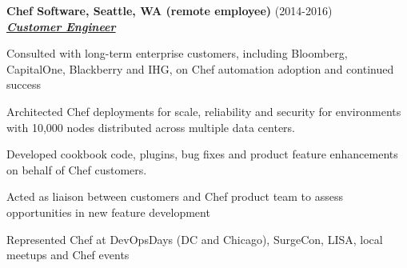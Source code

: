 \documentclass{article}
\newcommand{\employer}[3]{{ \textbf{#1} (#2)\\ \underline{\textbf{\emph{#3}}}\\ \nopagebreak }}
\newenvironment{achievements}{\begin{list}{\topsep 0pt \itemsep -2pt}} {\vspace*{4pt}\end{list}}
\begin{document}
\employer{Chef Software, Seattle, WA (remote employee)}{2014-2016}{Customer Engineer}
\begin{achievements}
  \item Consulted with long-term enterprise customers, including Bloomberg, CapitalOne, Blackberry and IHG, on Chef automation adoption and continued success
  \item Architected Chef deployments for scale, reliability and security for environments with 10,000 nodes distributed across multiple data centers.
  \item Developed cookbook code, plugins, bug fixes and product feature enhancements on behalf of Chef customers.
  \item Acted as liaison between customers and Chef product team to assess opportunities in new feature development
  \item Represented Chef at DevOpsDays (DC and Chicago), SurgeCon, LISA, local meetups and Chef events
\end{achievements}
\end{document}
